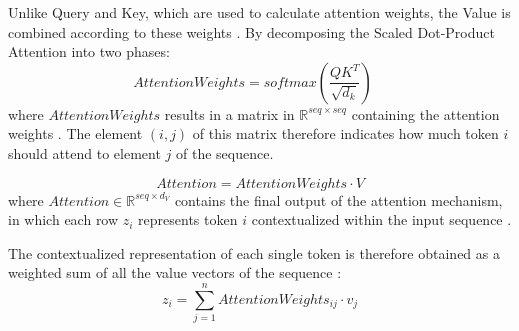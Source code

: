 Unlike Query and Key, which are used to calculate attention weights, the Value is combined according to these weights \cite{arxiv-attention}. By decomposing the Scaled Dot-Product Attention into two phases:
\begin{equation*}
    AttentionWeights=softmax\left( \frac{QK^T}{\sqrt{d_k}} \right) \quad \tag{Phase 1}
\end{equation*}
where $AttentionWeights$ results in a matrix in $\mathbb{R}^{seq\times seq}$ containing the attention weights \cite{arxiv-attention, git-hub}. The element $(i,j)$ of this matrix therefore indicates how much token $i$ should attend to element $j$ of the sequence.

\begin{equation*}
Attention=AttentionWeights\cdot V \tag{Phase 2}
\end{equation*}
where $Attention \in \mathbb{R}^{seq \times d_V}$ contains the final output of the attention mechanism, in which each row $z_i$ represents token $i$ contextualized within the input sequence \cite{arxiv-attention}.

The contextualized representation of each single token is therefore obtained as a weighted sum of all the value vectors of the sequence \cite{stanford, git-hub}:
\begin{equation}
z_i=\sum^n_{j=1}AttentionWeights_{ij}\cdot v_j
\end{equation}

